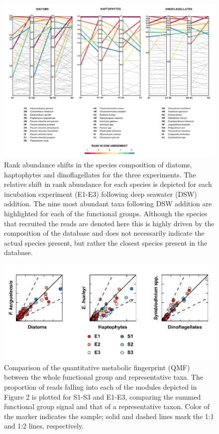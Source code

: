 \begin{figure}[p!]
  \centering
    \includegraphics[width=1\textwidth]{Images/C4_FigureS2.pdf}
    \caption[Rank abundance shifts in the species composition of diatoms, haptophytes and dinoflagellates]{Rank abundance shifts in the species composition of diatoms, haptophytes and dinoflagellates for the three experiments. The relative shift in rank abundance for each species is depicted for each incubation experiment (E1-E3) following deep seawater (DSW) addition. The nine most abundant taxa following DSW addition are highlighted for each of the functional groups. Although the species that recruited the reads are denoted here this is highly driven by the composition of the database and does not necessarily indicate the actual species present, but rather the closest species present in the database.}
  \label{fig:a4f2}
\end{figure}



\begin{figure}[p!]
  \centering
    \includegraphics[width=1\textwidth]{Images/C4_FigureS3.pdf}
    \caption[Comparison of the quantitative metabolic fingerprint (QMF) between the whole functional group and representative taxa]{Comparison of the quantitative metabolic fingerprint (QMF) between the whole functional group and representative taxa. The proportion of reads falling into each of the modules depicted in Figure 2 is plotted for S1-S3 and E1-E3, comparing the summed functional group signal and that of a representative taxon. Color of the marker indicates the sample; solid and dashed lines mark the 1:1 and 1:2 lines, respectively.}
  \label{fig:a4f3}
\end{figure}

